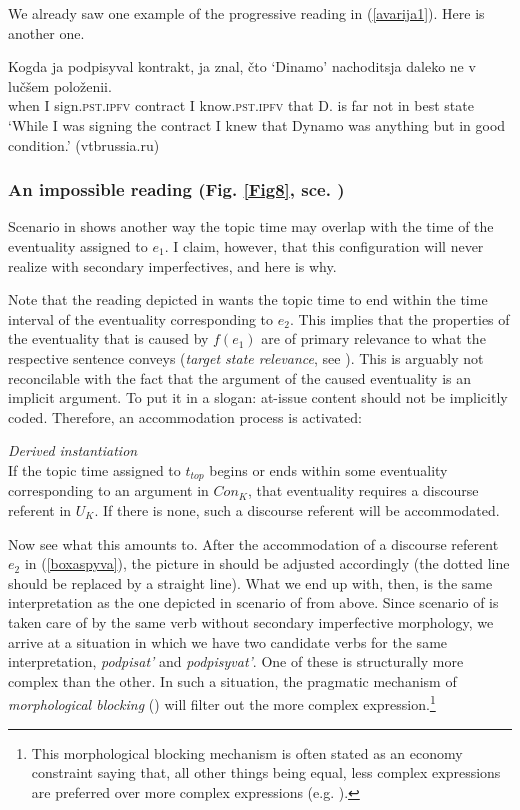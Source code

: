 \documentclass[output=paper,colorlinks,citecolor=brown]{langscibook}
\begin{document}
We already saw one example of the progressive reading in (\ref{avarija1}). Here is another one.  

 \ea\label{kontrakt}
\gll Kogda
ja podpisyval 
kontrakt, ja znal, čto
`Dinamo' nachoditsja daleko ne v 
lučšem položenii. \\
when I sign.\textsc{pst.ipfv} contract I know.\textsc{pst.ipfv} that D. is far not in best state \\
\glt `While I was signing the contract I knew that Dynamo was anything but in good condition.' \hfill (vtbrussia.ru)
\z 
 
\subsubsection{An impossible reading (Fig. \ref{Fig8}, sce. )} \label{sdfr}
Scenario  in  shows another way the topic time may overlap with the time of the eventuality assigned to $e_1$. I claim, however, that this configuration will never realize with secondary imperfectives, and here is why.

Note that the reading depicted in  wants the topic time to end within the time interval of the eventuality corresponding to $e_2$. This implies that the properties of the eventuality that is caused by $f(e_1)$ are of primary relevance to what the respective sentence conveys (\textit{target state relevance}, see \citealt{Gronn2004}). This is arguably not reconcilable with the fact that the argument of the caused eventuality is an implicit argument. To put it in a slogan: at-issue content should not be implicitly coded. 
Therefore, an accommodation process is activated:

\eanoraggedright \label{ttl}\textit{Derived instantiation} \\
If the topic time assigned to $t_{top}$ begins or ends within some eventuality corresponding to an argument in $Con_K$, that eventuality requires a discourse referent in $U_K$. If there is none, such a discourse referent will be accommodated.  
\z

\noindent Now see what this amounts to. After the accommodation of a discourse referent  $e_2$ in (\ref{boxaspyva}), the picture in  should be adjusted 
accordingly (the dotted line should be replaced by a straight line). What we end up with, then, is
the same interpretation as the one depicted in scenario  of  from above. Since scenario  of  is taken care of by the same verb
without secondary imperfective morphology, 
we arrive at a situation in which we have two candidate verbs for the same interpretation, \textit{podpisat'}
and \textit{podpisyvat'}. One of these is structurally more complex than the other. 
In such a situation, the pragmatic mechanism of \textit{morphological blocking} (\citealt{Kiparsky05, Deo2012}) will filter out the more complex 
expression.\footnote{This morphological blocking mechanism is often stated as an economy constraint saying that, all other things being equal, less complex expressions are preferred over more complex expressions
(e.g. \citealt{LeBruyn07}).}
\end{document}
